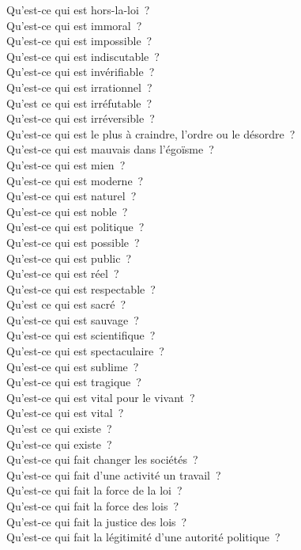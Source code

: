 \documentclass[a4paper,12pt]{article}
\begin{document}
Qu'est-ce qui est hors-la-loi ? \\
Qu'est-ce qui est immoral ? \\
Qu'est-ce qui est impossible ? \\
Qu'est-ce qui est indiscutable ? \\
Qu'est-ce qui est invérifiable ? \\
Qu'est-ce qui est irrationnel ? \\
Qu'est ce qui est irréfutable ? \\
Qu'est-ce qui est irréversible ? \\
Qu'est-ce qui est le plus à craindre, l'ordre ou le désordre ? \\
Qu'est-ce qui est mauvais dans l'égoïsme ? \\
Qu'est-ce qui est mien ? \\
Qu'est-ce qui est moderne ? \\
Qu'est-ce qui est naturel ? \\
Qu'est-ce qui est noble ? \\
Qu'est-ce qui est politique ? \\
Qu'est-ce qui est possible ? \\
Qu'est-ce qui est public ? \\
Qu'est-ce qui est réel ? \\
Qu'est-ce qui est respectable ? \\
Qu'est ce qui est sacré ? \\
Qu'est-ce qui est sauvage ? \\
Qu'est-ce qui est scientifique ? \\
Qu'est-ce qui est spectaculaire ? \\
Qu'est-ce qui est sublime ? \\
Qu'est-ce qui est tragique ? \\
Qu'est-ce qui est vital pour le vivant ? \\
Qu'est-ce qui est vital ? \\
Qu'est ce qui existe ? \\
Qu'est-ce qui existe ? \\
Qu'est-ce qui fait changer les sociétés ? \\
Qu'est-ce qui fait d'une activité un travail ? \\
Qu'est-ce qui fait la force de la loi ? \\
Qu'est-ce qui fait la force des lois ? \\
Qu'est-ce qui fait la justice des lois ? \\
Qu'est-ce qui fait la légitimité d'une autorité politique ? \\
\end{document}

